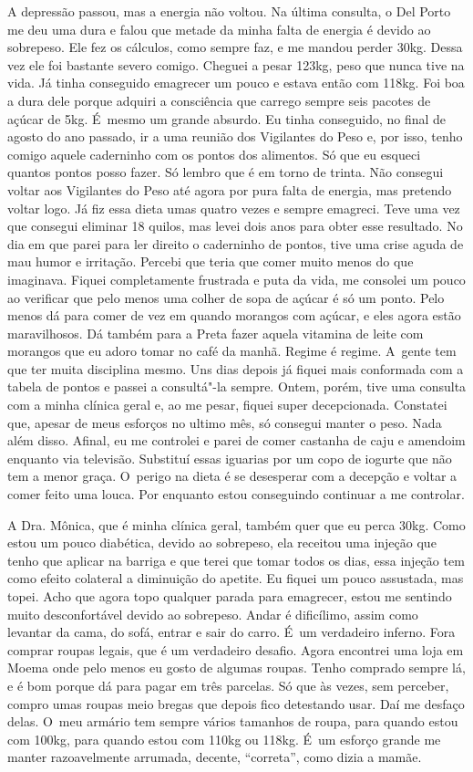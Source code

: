 A depressão passou, mas a energia não voltou. Na última consulta, o Del
Porto me deu uma dura e falou que metade da minha falta de energia é
devido ao sobrepeso. Ele fez os cálculos, como sempre faz, e me mandou
perder 30kg. Dessa vez ele foi bastante severo comigo. Cheguei a pesar
123kg, peso que nunca tive na vida. Já tinha conseguido emagrecer um
pouco e estava então com 118kg. Foi boa a dura dele porque adquiri a
consciência que carrego sempre seis pacotes de açúcar de 5kg. É~mesmo um
grande absurdo. Eu tinha conseguido, no final de agosto do ano passado,
ir a uma reunião dos Vigilantes do Peso e, por isso, tenho comigo aquele
caderninho com os pontos dos alimentos. Só que eu esqueci quantos pontos
posso fazer. Só lembro que é em torno de trinta. Não consegui voltar aos
Vigilantes do Peso até agora por pura falta de energia, mas pretendo
voltar logo. Já fiz essa dieta umas quatro vezes e sempre emagreci. Teve
uma vez que consegui eliminar 18 quilos, mas levei dois anos para obter
esse resultado. No dia em que parei para ler direito o caderninho de
pontos, tive uma crise aguda de mau humor e irritação. Percebi que teria
que comer muito menos do que imaginava. Fiquei completamente frustrada e
puta da vida, me consolei um pouco ao verificar que pelo menos uma
colher de sopa de açúcar é só um ponto. Pelo menos dá para comer de vez
em quando morangos com açúcar, e eles agora estão maravilhosos. Dá
também para a Preta fazer aquela vitamina de leite com morangos que eu
adoro tomar no café da manhã. Regime é regime. A~gente tem que ter muita
disciplina mesmo. Uns dias depois já fiquei mais conformada com a tabela
de pontos e passei a consultá"-la sempre. Ontem, porém, tive uma consulta
com a minha clínica geral e, ao me pesar, fiquei super decepcionada.
Constatei que, apesar de meus esforços no ultimo mês, só consegui manter
o peso. Nada além disso. Afinal, eu me controlei e parei de comer
castanha de caju e amendoim enquanto via televisão. Substituí essas
iguarias por um copo de iogurte que não tem a menor graça. O~perigo na
dieta é se desesperar com a decepção e voltar a comer feito uma louca.
Por enquanto estou conseguindo continuar a me controlar.

A Dra. Mônica, que é minha clínica geral, também quer que eu perca 30kg.
Como estou um pouco diabética, devido ao sobrepeso, ela receitou uma
injeção que tenho que aplicar na barriga e que terei que tomar todos os
dias, essa injeção tem como efeito colateral a diminuição do apetite. Eu
fiquei um pouco assustada, mas topei. Acho que agora topo qualquer
parada para emagrecer, estou me sentindo muito desconfortável devido ao
sobrepeso. Andar é dificílimo, assim como levantar da cama, do sofá,
entrar e sair do carro. É~um verdadeiro inferno. Fora comprar roupas
legais, que é um verdadeiro desafio. Agora encontrei uma loja em Moema
onde pelo menos eu gosto de algumas roupas. Tenho comprado sempre lá, e
é bom porque dá para pagar em três parcelas. Só que às vezes, sem
perceber, compro umas roupas meio bregas que depois fico detestando
usar. Daí me desfaço delas. O~meu armário tem sempre vários tamanhos de
roupa, para quando estou com 100kg, para quando estou com 110kg ou
118kg. É~um esforço grande me manter razoavelmente arrumada, decente,
``correta'', como dizia a mamãe.

